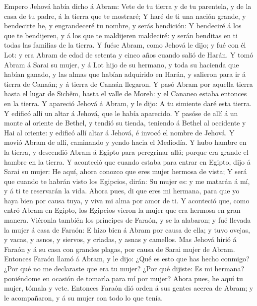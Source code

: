  Empero Jehová había dicho á Abram: Vete de tu tierra y de
tu parentela, y de la casa de tu padre, á la tierra que te mostraré;
 Y haré de ti una nación grande, y bendecirte he, y
engrandeceré tu nombre, y serás bendición:  Y bendeciré á
los que te bendijeren, y á los que te maldijeren maldeciré: y serán
benditas en ti todas las familias de la tierra.  Y fuése
Abram, como Jehová le dijo; y fué con él Lot: y era Abram de edad de
setenta y cinco años cuando salió de Harán.  Y tomó Abram á
Sarai su mujer, y á Lot hijo de su hermano, y toda su hacienda que
habían ganado, y las almas que habían adquirido en Harán, y salieron
para ir á tierra de Canaán; y á tierra de Canaán llegaron. 
Y pasó Abram por aquella tierra hasta el lugar de Sichêm, hasta el valle
de Moreh: y el Cananeo estaba entonces en la tierra.  Y
apareció Jehová á Abram, y le dijo: A tu simiente daré esta tierra. Y
edificó allí un altar á Jehová, que le había aparecido.  Y
pasóse de allí á un monte al oriente de Bethel, y tendió su tienda,
teniendo á Bethel al occidente y Hai al oriente: y edificó allí altar á
Jehová, é invocó el nombre de Jehová.  Y movió Abram de
allí, caminando y yendo hacia el Mediodía.  Y hubo hambre
en la tierra, y descendió Abram á Egipto para peregrinar allá; porque
era grande el hambre en la tierra.  Y aconteció que cuando
estaba para entrar en Egipto, dijo á Sarai su mujer: He aquí, ahora
conozco que eres mujer hermosa de vista;  Y será que cuando
te habrán visto los Egipcios, dirán: Su mujer es: y me matarán á mí, y á
ti te reservarán la vida.  Ahora pues, di que eres mi
hermana, para que yo haya bien por causa tuya, y viva mi alma por amor
de ti.  Y aconteció que, como entró Abram en Egipto, los
Egipcios vieron la mujer que era hermosa en gran manera. 
Viéronla también los príncipes de Faraón, y se la alabaron; y fué
llevada la mujer á casa de Faraón:  E hizo bien á Abram por
causa de ella; y tuvo ovejas, y vacas, y asnos, y siervos, y criadas, y
asnas y camellos.  Mas Jehová hirió á Faraón y á su casa
con grandes plagas, por causa de Sarai mujer de Abram. 
Entonces Faraón llamó á Abram, y le dijo: ¿Qué es esto que has hecho
conmigo? ¿Por qué no me declaraste que era tu mujer?  ¿Por
qué dijiste: Es mi hermana? poniéndome en ocasión de tomarla para mí por
mujer? Ahora pues, he aquí tu mujer, tómala y vete. 
Entonces Faraón dió orden á sus gentes acerca de Abram; y le
acompañaron, y á su mujer con todo lo que tenía.

